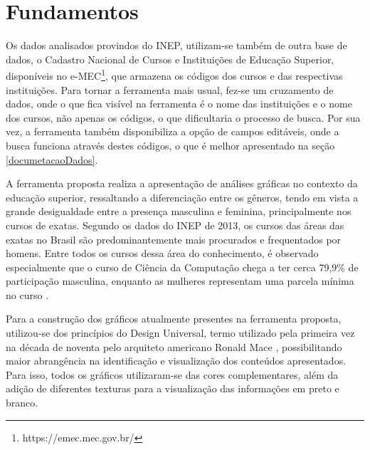 \documentclass[12pt]{article}
\begin{document}
\section{Fundamentos}\label{fundamentos}
Os dados analisados provindos do INEP, utilizam-se também de outra base de dados, o Cadastro Nacional de Cursos e Instituições de Educação Superior, disponíveis no e-MEC\footnote{https://emec.mec.gov.br/}, que armazena os códigos dos cursos e das respectivas instituições.  Para tornar a ferramenta mais usual, fez-se um cruzamento de dados, onde o que fica visível na ferramenta  é o nome das instituições e o nome dos cursos, não apenas os códigos, o que dificultaria o processo de busca. Por sua vez, a ferramenta também disponibiliza a opção de campos editáveis, onde a busca funciona através destes códigos, o que é melhor apresentado na seção \ref{documetacaoDados}.

A ferramenta proposta realiza a apresentação de análises gráficas no contexto da educação superior, ressaltando a diferenciação entre os gêneros, tendo em vista a grande desigualdade entre a presença masculina e feminina, principalmente nos cursos de exatas. Segundo os dados do INEP de 2013, os cursos das áreas das exatas no Brasil são predominantemente mais procurados e frequentados por homens. Entre todos os cursos dessa área do conhecimento, é observado especialmente que o curso de Ciência da Computação chega a ter cerca 79,9\% de participação masculina, enquanto as mulheres representam uma parcela mínima no curso \cite{lima:2013}. %

Para a construção dos gráficos atualmente presentes na ferramenta proposta, utilizou-se dos princípios do Design Universal, termo utilizado pela primeira vez na década de noventa pelo arquiteto americano Ronald Mace \cite{cud:2002}, possibilitando maior abrangência na identificação e visualização dos conteúdos apresentados. Para isso, todos os gráficos utilizaram-se das cores complementares, além da adição de diferentes texturas para a visualização das informações em preto e branco.

\end{document}
